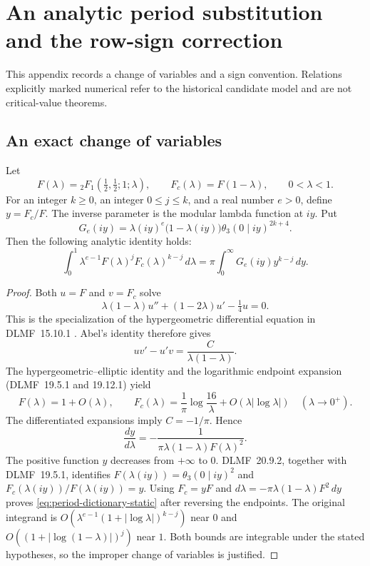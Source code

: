 \section{An analytic period substitution and the row-sign correction}\label{app:period}

This appendix records a change of variables and a sign convention. Relations explicitly marked numerical refer to the historical candidate model and are not critical-value theorems.

\subsection{An exact change of variables}
Let
\[
 F(\lambda)={}_2F_1\!\left(\tfrac12,\tfrac12;1;\lambda\right),
 \qquad F_c(\lambda)=F(1-\lambda),\qquad 0<\lambda<1.
\]
For an integer $k\geq0$, an integer $0\leq j\leq k$, and a real number
$e>0$, define $y=F_c/F$. The inverse parameter is the modular lambda
function at $iy$. Put
\[
 G_e(iy)=\lambda(iy)^e\bigl(1-\lambda(iy)\bigr)
          \theta_3(0\mid iy)^{2k+4}.
\]
Then the following analytic identity holds:
\begin{equation}\label{eq:period-dictionary-static}
 \int_0^1\lambda^{e-1} F(\lambda)^j F_c(\lambda)^{k-j}\,d\lambda
 =\pi\int_0^\infty G_e(iy)y^{k-j}\,dy.
\end{equation}

\begin{proof}
Both $u=F$ and $v=F_c$ solve
\[
 \lambda(1-\lambda)u''+(1-2\lambda)u'-\tfrac14u=0.
\]
This is the specialization of the hypergeometric differential equation in
DLMF~15.10.1 \cite{DLMF}. Abel's identity therefore gives
\[
 uv'-u'v=\frac{C}{\lambda(1-\lambda)}.
\]
The hypergeometric--elliptic identity and the logarithmic endpoint expansion
(DLMF~19.5.1 and 19.12.1) yield
\[
 F(\lambda)=1+O(\lambda),\qquad
 F_c(\lambda)=\frac1\pi\log\frac{16}{\lambda}
                +O(\lambda|\log\lambda|)
 \quad(\lambda\longrightarrow0^+).
\]
The differentiated expansions imply $C=-1/\pi$. Hence
\begin{equation}\label{eq:period-jacobian-static}
 \frac{dy}{d\lambda}
 =-\frac{1}{\pi\lambda(1-\lambda)F(\lambda)^2}.
\end{equation}
The positive function $y$ decreases from $+\infty$ to $0$. DLMF~20.9.2,
together with DLMF~19.5.1, identifies
$F(\lambda(iy))=\theta_3(0\mid iy)^2$ and
$F_c(\lambda(iy))/F(\lambda(iy))=y$.
Using $F_c=yF$ and
$d\lambda=-\pi\lambda(1-\lambda)F^2\,dy$ proves
\eqref{eq:period-dictionary-static} after reversing the endpoints.
The original integrand is
$O(\lambda^{e-1}(1+|\log\lambda|)^{k-j})$ near $0$ and
$O((1+|\log(1-\lambda)|)^j)$ near $1$.
Both bounds are integrable under the stated hypotheses, so the improper
change of variables is justified.\end{proof}

